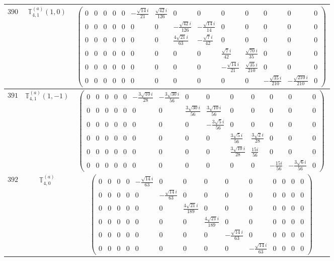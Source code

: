 \documentclass[fleqn,8pt,landscape]{jsarticle}
\begin{document}
\begin{center}
\begin{longtable}{ccc}
$ 390 $ & $ \mathbb{T}_{4,1}^{(a)}(1,0) $ & $ \begin{pmatrix} 0 & 0 & 0 & 0 & 0 & - \frac{\sqrt{14} i}{21} & \frac{\sqrt{42} i}{126} & 0 & 0 & 0 & 0 & 0 & 0 & 0 \\ 0 & 0 & 0 & 0 & 0 & 0 & 0 & - \frac{\sqrt{42} i}{126} & - \frac{\sqrt{14} i}{14} & 0 & 0 & 0 & 0 & 0 \\ 0 & 0 & 0 & 0 & 0 & 0 & 0 & \frac{4 \sqrt{21} i}{63} & - \frac{\sqrt{7} i}{42} & 0 & 0 & 0 & 0 & 0 \\ 0 & 0 & 0 & 0 & 0 & 0 & 0 & 0 & 0 & \frac{\sqrt{7} i}{42} & \frac{\sqrt{70} i}{35} & 0 & 0 & 0 \\ 0 & 0 & 0 & 0 & 0 & 0 & 0 & 0 & 0 & - \frac{\sqrt{14} i}{21} & \frac{\sqrt{35} i}{210} & 0 & 0 & 0 \\ 0 & 0 & 0 & 0 & 0 & 0 & 0 & 0 & 0 & 0 & 0 & - \frac{\sqrt{35} i}{210} & - \frac{\sqrt{210} i}{210} & 0 \end{pmatrix} $ \\ \hline
$ 391 $ & $ \mathbb{T}_{4,1}^{(a)}(1,-1) $ & $ \begin{pmatrix} 0 & 0 & 0 & 0 & 0 & - \frac{3 \sqrt{10} i}{28} & - \frac{3 \sqrt{30} i}{56} & 0 & 0 & 0 & 0 & 0 & 0 & 0 \\ 0 & 0 & 0 & 0 & 0 & 0 & 0 & \frac{3 \sqrt{30} i}{56} & \frac{3 \sqrt{10} i}{56} & 0 & 0 & 0 & 0 & 0 \\ 0 & 0 & 0 & 0 & 0 & 0 & 0 & 0 & - \frac{3 \sqrt{5} i}{56} & 0 & 0 & 0 & 0 & 0 \\ 0 & 0 & 0 & 0 & 0 & 0 & 0 & 0 & 0 & \frac{3 \sqrt{5} i}{56} & \frac{3 \sqrt{2} i}{28} & 0 & 0 & 0 \\ 0 & 0 & 0 & 0 & 0 & 0 & 0 & 0 & 0 & \frac{3 \sqrt{10} i}{28} & \frac{15 i}{56} & 0 & 0 & 0 \\ 0 & 0 & 0 & 0 & 0 & 0 & 0 & 0 & 0 & 0 & 0 & - \frac{15 i}{56} & - \frac{3 \sqrt{6} i}{56} & 0 \end{pmatrix} $ \\ \hline
$ 392 $ & $ \mathbb{T}_{4,0}^{(a)} $ & $ \begin{pmatrix} 0 & 0 & 0 & 0 & - \frac{\sqrt{14} i}{63} & 0 & 0 & 0 & 0 & 0 & 0 & 0 & 0 & 0 \\ 0 & 0 & 0 & 0 & 0 & - \frac{\sqrt{14} i}{63} & 0 & 0 & 0 & 0 & 0 & 0 & 0 & 0 \\ 0 & 0 & 0 & 0 & 0 & 0 & \frac{4 \sqrt{21} i}{189} & 0 & 0 & 0 & 0 & 0 & 0 & 0 \\ 0 & 0 & 0 & 0 & 0 & 0 & 0 & \frac{4 \sqrt{21} i}{189} & 0 & 0 & 0 & 0 & 0 & 0 \\ 0 & 0 & 0 & 0 & 0 & 0 & 0 & 0 & - \frac{\sqrt{14} i}{63} & 0 & 0 & 0 & 0 & 0 \\ 0 & 0 & 0 & 0 & 0 & 0 & 0 & 0 & 0 & - \frac{\sqrt{14} i}{63} & 0 & 0 & 0 & 0 \end{pmatrix} $ \\ \hline

\end{longtable}
\end{center}
\end{document}
